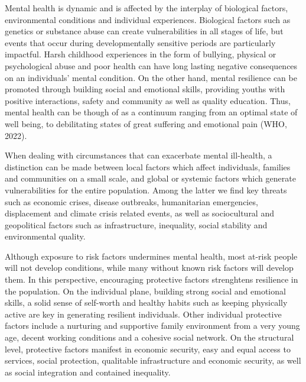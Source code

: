     Mental health is dynamic and is affected by the interplay of biological factors, environmental conditions and individual experiences. Biological factors such as genetics or substance abuse can create vulnerabilities in all stages of life, but events that occur during developmentally sensitive periods are particularly impactful. Harsh childhood experiences in the form of bullying, physical or psychological abuse and poor health can have long lasting negative consequences on an individuals' mental condition. On the other hand, mental resilience can be promoted through building social and emotional skills, providing youths with positive interactions, safety and community as well as quality education. 
    Thus, mental health can be though of as a continuum ranging from an optimal state of well being, to debilitating states of great suffering and emotional pain (WHO, 2022).

    When dealing with circumstances that can exacerbate mental ill-health, a distinction can be made between local factors which affect individuals, families and communities on a small scale, and global or systemic factors which generate vulnerabilities for the entire population. Among the latter we find key threats such as economic crises, disease outbreaks, humanitarian emergencies, displacement and climate crisis related events, as well as sociocultural and geopolitical factors such as infrastructure, inequality, social stability and environmental quality. 
    
    Although exposure to risk factors undermines mental health, most at-risk people will not develop conditions, while many without known risk factors will develop them. In this perspective, encouraging protective factors strenghtens resilience in the population. On the individual plane, building strong social and emotional skills, a solid sense of self-worth and healthy habits such as keeping physically active are key in generating resilient individuals. Other individual protective factors include a nurturing and supportive family environment from a very young age, decent working conditions and a cohesive social network. On the structural level, protective factors manifest in economic security, easy and equal access to services, social protection, qualitable infrastructure and economic security, as well as social integration and contained inequality.  


        



